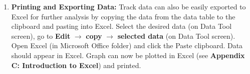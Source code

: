 \begin{enumerate}
\item {\bf Printing and Exporting Data:} Track data can also be easily exported to Excel for further analysis by copying the data from the data table to the clipboard and pasting into Excel. 
Select the desired data (on Data Tool screen), go to {\bf Edit} $\rightarrow$ {\bf copy} $\rightarrow$ {\bf selected data} (on Data Tool screen). 
Open Excel (in Microsoft Office folder) and click the Paste clipboard. Data should appear in Excel. Graph can now be plotted in Excel (see {\bf Appendix C: Introduction to Excel}) and printed.

\end{enumerate} 

